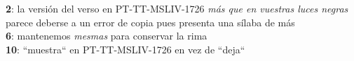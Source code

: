 \noindent \textbf{2}: la versión del verso en PT-TT-MSLIV-1726 \textit{más que en vuestras luces negras} parece deberse a un error de copia pues presenta una sílaba de más\\
\textbf{6}: mantenemos \textit{mesmas} para conservar la rima\\
\textbf{10}: ``muestra`` en PT-TT-MSLIV-1726 en vez de ``deja``
